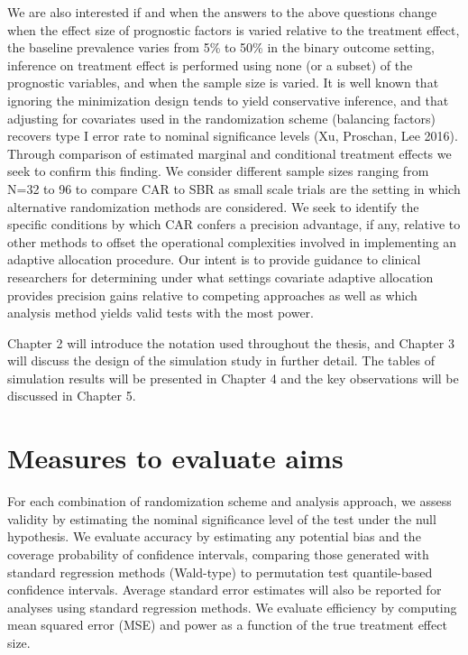 We are also interested if and when the answers to the above questions change when the effect size of prognostic factors is varied relative to the treatment effect, the baseline prevalence varies from 5\% to 50\% in the binary outcome setting, inference on treatment effect is performed using none (or a subset) of the prognostic variables, and when the sample size is varied.
It is well known that ignoring the minimization design tends to yield conservative inference, and that adjusting for covariates used in the randomization scheme (balancing factors) recovers type I error rate to nominal significance levels (Xu, Proschan, Lee 2016). 
Through comparison of estimated marginal and conditional treatment effects we seek to confirm this finding.
We consider different sample sizes ranging from N=32 to 96 to compare CAR to SBR as small scale trials are the setting in which alternative randomization methods are considered. 
We seek to identify the specific conditions by which CAR confers a precision advantage, if any, relative to other methods to offset the operational complexities involved in implementing an adaptive allocation procedure.  
Our intent is to provide guidance to clinical researchers for determining under what settings covariate adaptive allocation provides precision gains relative to competing approaches as well as which analysis method yields valid tests with the most power. 

Chapter 2 will introduce the notation used throughout the thesis, and Chapter 3 will discuss the design of the simulation study in further detail.  
The tables of simulation results will be presented in Chapter 4 and the key observations will be discussed in Chapter 5.

\section{Measures to evaluate aims}
For each combination of randomization scheme and analysis approach, we assess validity by estimating the nominal significance level of the test under the null hypothesis.  
We evaluate accuracy by estimating any potential bias and the coverage probability of confidence intervals, comparing those generated with standard regression methods (Wald-type) to permutation test quantile-based confidence intervals.  
Average standard error estimates will also be reported for analyses using standard regression methods.  
We evaluate efficiency by computing mean squared error (MSE) and power as a function of the true treatment effect size. 

